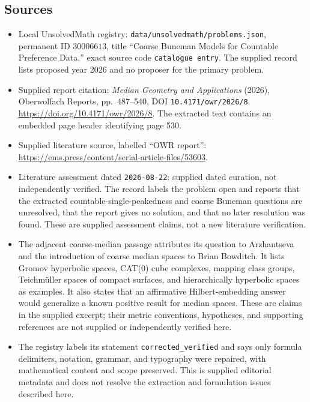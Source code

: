 \documentclass[11pt]{article}
\begin{document}
\subsection{Sources}
\begin{itemize}
\item Local UnsolvedMath registry: \texttt{data/unsolvedmath/problems.json}, permanent ID \(30006613\), title ``Coarse Buneman Models for Countable Preference Data,'' exact source code \texttt{catalogue entry}. The supplied record lists proposed year 2026 and no proposer for the primary problem.
\item Supplied report citation: \emph{Median Geometry and Applications} (2026), Oberwolfach Reports, pp.~487--540, DOI \texttt{10.4171/owr/2026/8}. \url{https://doi.org/10.4171/owr/2026/8}. The extracted text contains an embedded page header identifying page 530.
\item Supplied literature source, labelled ``OWR report'': \url{https://ems.press/content/serial-article-files/53603}.
\item Literature assessment dated \texttt{2026-08-22}: supplied dated curation, not independently verified. The record labels the problem open and reports that the extracted countable-single-peakedness and coarse Buneman questions are unresolved, that the report gives no solution, and that no later resolution was found. These are supplied assessment claims, not a new literature verification.
\item The adjacent coarse-median passage attributes its question to Arzhantseva and the introduction of coarse median spaces to Brian Bowditch. It lists Gromov hyperbolic spaces, CAT(0) cube complexes, mapping class groups, Teichm\"uller spaces of compact surfaces, and hierarchically hyperbolic spaces as examples. It also states that an affirmative Hilbert-embedding answer would generalize a known positive result for median spaces. These are claims in the supplied excerpt; their metric conventions, hypotheses, and supporting references are not supplied or independently verified here.
\item The registry labels its statement \texttt{corrected\_verified} and says only formula delimiters, notation, grammar, and typography were repaired, with mathematical content and scope preserved. This is supplied editorial metadata and does not resolve the extraction and formulation issues described here.
\end{itemize}
\end{document}
